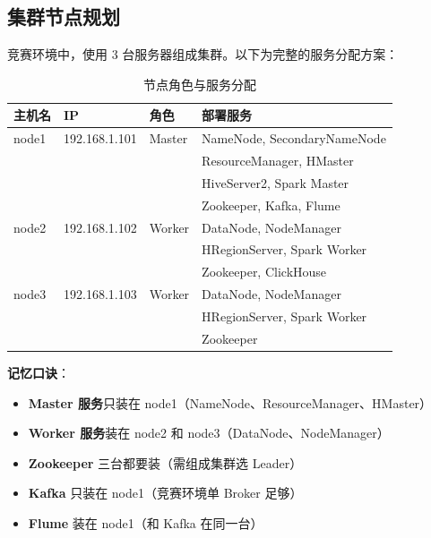 \documentclass[12pt,a4paper]{article}
\begin{document}
\subsection{集群节点规划}

\begin{theorybox}
竞赛环境中，使用 3 台服务器组成集群。以下为完整的服务分配方案：

\begin{table}[H]
\centering
\caption{节点角色与服务分配}
{\small
\begin{tabular}{llll}
\toprule
\textbf{主机名} & \textbf{IP} & \textbf{角色} & \textbf{部署服务} \\
\midrule
node1 & 192.168.1.101 & Master & NameNode, SecondaryNameNode \\
      &               &        & ResourceManager, HMaster \\
      &               &        & HiveServer2, Spark Master \\
      &               &        & Zookeeper, Kafka, Flume \\
\midrule
node2 & 192.168.1.102 & Worker & DataNode, NodeManager \\
      &               &        & HRegionServer, Spark Worker \\
      &               &        & Zookeeper, ClickHouse \\
\midrule
node3 & 192.168.1.103 & Worker & DataNode, NodeManager \\
      &               &        & HRegionServer, Spark Worker \\
      &               &        & Zookeeper \\
\bottomrule
\end{tabular}
}
\end{table}

\textbf{记忆口诀}：
\begin{itemize}
    \item \textbf{Master 服务}只装在 node1（NameNode、ResourceManager、HMaster）
    \item \textbf{Worker 服务}装在 node2 和 node3（DataNode、NodeManager）
    \item \textbf{Zookeeper} 三台都要装（需组成集群选 Leader）
    \item \textbf{Kafka} 只装在 node1（竞赛环境单 Broker 足够）
    \item \textbf{Flume} 装在 node1（和 Kafka 在同一台）
\end{itemize}
\end{theorybox}
\end{document}
